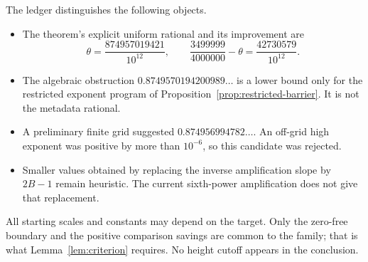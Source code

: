 \documentclass[12pt]{article}
\begin{document}
The ledger distinguishes the following objects.
\begin{itemize}
\item The theorem's explicit uniform rational and its improvement are
\[
 \theta=\frac{874957019421}{10^{12}},\qquad
 \frac{3499999}{4000000}-\theta=\frac{42730579}{10^{12}}.
\]
\item The algebraic obstruction
\(0.8749570194200989\ldots\) is a lower bound only for the
restricted exponent program of Proposition~\ref{prop:restricted-barrier}.
It is not the metadata rational.
\item A preliminary finite grid suggested
\(0.874956994782\ldots\).  An off-grid high exponent was positive
by more than \(10^{-6}\), so this candidate was rejected.
\item Smaller values obtained by replacing the inverse
amplification slope by \(2B-1\) remain heuristic.  The current
sixth-power amplification does not give that replacement.
\end{itemize}
All starting scales and constants may depend on the target.
Only the zero-free boundary and the positive comparison savings
are common to the family; that is what
Lemma~\ref{lem:criterion} requires.  No height cutoff appears
in the conclusion.
\end{document}
